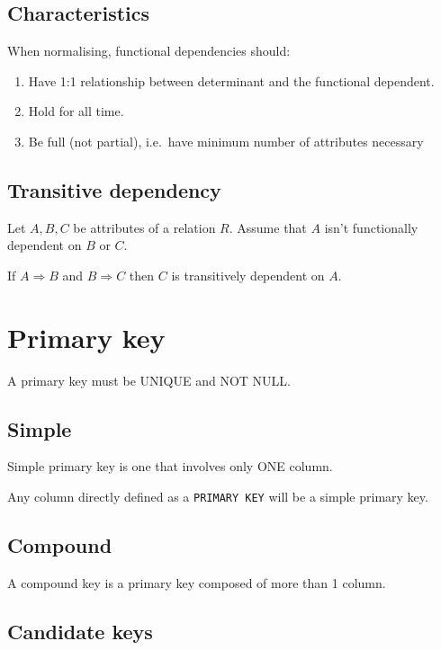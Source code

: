 \documentclass[slides]{pgnotes}
\begin{document}
\subsection{Characteristics}\label{characteristics}

When normalising, functional dependencies should:

\begin{enumerate}
\def\labelenumi{\arabic{enumi}.}
\item
  Have 1:1 relationship between determinant and the functional
  dependent.
\item
  Hold for all time.
\item
  Be full (not partial), i.e.~have minimum number of attributes
  necessary
\end{enumerate}


\subsection{Transitive dependency}\label{transitive-dependency}

Let \(A, B, C\) be attributes of a relation \(R\). Assume that \(A\)
isn't functionally dependent on \(B\) or \(C\).

If \(A \Rightarrow B\) and \(B \Rightarrow C\) then \(C\) is
transitively dependent on \(A\).


\section{Primary key}\label{primary-key}

A primary key must be UNIQUE and NOT NULL.

\subsection{Simple}\label{simple}

Simple primary key is one that involves only ONE column.

Any column directly defined as a \texttt{PRIMARY\ KEY} will be a simple
primary key.

\subsection{Compound}\label{compound}

A compound key is a primary key composed of more than 1 column.

\subsection{Candidate keys}\label{candidate-keys}
\end{document}
